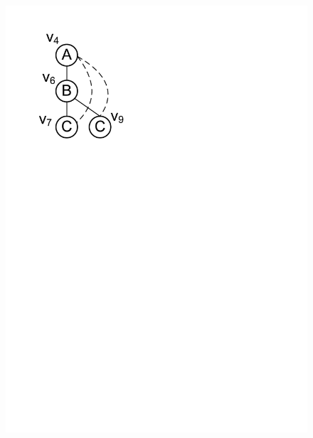 \begin{figure}[t!]
{{			\includegraphics[scale=0.35]{images/tree_structure1}
			\label{fig:tree_structure1}
		}
	}
	\captionsetup[subfigure]{skip=5pt}
	\begin{subfigure}[b]{0.2\textwidth}

\end{subfigure}
\end{figure}
